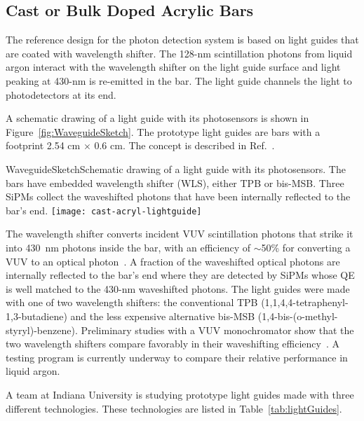 \subsection{Cast or Bulk Doped Acrylic Bars}
\label{sec_bars}

The reference design for the photon detection system is based on light
guides that are coated with wavelength shifter. The 128-nm
scintillation photons from liquid argon interact with the wavelength
shifter on the light guide surface and light peaking at 430-nm is
re-emitted in the bar.  The light guide channels the light to
photodetectors at its end.

A schematic drawing of a light guide with its photosensors is shown in
Figure~\ref{fig:WaveguideSketch}. The prototype light guides are bars
with a footprint 2.54 cm $\times$ 0.6 cm.  The concept is described in
Ref.~\cite{bib:MITbars}.

\begin{cdrfigure}{WaveguideSketch}{Schematic drawing of a light guide with its
      photosensors. The bars have embedded wavelength shifter (WLS),
      either TPB or bis-MSB. Three SiPMs collect the waveshifted
      photons that have been internally reflected to the bar's end. }
    \texttt{[image: cast-acryl-lightguide]}
\end{cdrfigure}

The wavelength shifter converts incident VUV scintillation photons
that strike it into 430~nm photons inside the bar, with an efficiency of $\sim$50\% %
for converting a VUV to an optical photon~\cite{bib:gehman}.  A fraction
of the waveshifted optical photons are internally reflected to the
bar's end where they are detected by SiPMs whose QE is well matched to
the 430-nm waveshifted photons. The light guides were made with one of
two wavelength shifters: the conventional TPB
(1,1,4,4-tetraphenyl-1,3-butadiene) and the less expensive alternative
bis-MSB (1,4-bis-(o-methyl-styryl)-benzene). Preliminary studies with
a VUV monochromator show that the two wavelength shifters compare
favorably in their waveshifting efficiency~\cite{bib:baptistaJINST}. A
testing program is currently underway to compare their relative
performance in liquid argon.

A team at Indiana University is studying prototype light guides made with three 
different technologies. These technologies are listed in
Table~\ref{tab:lightGuides}.

